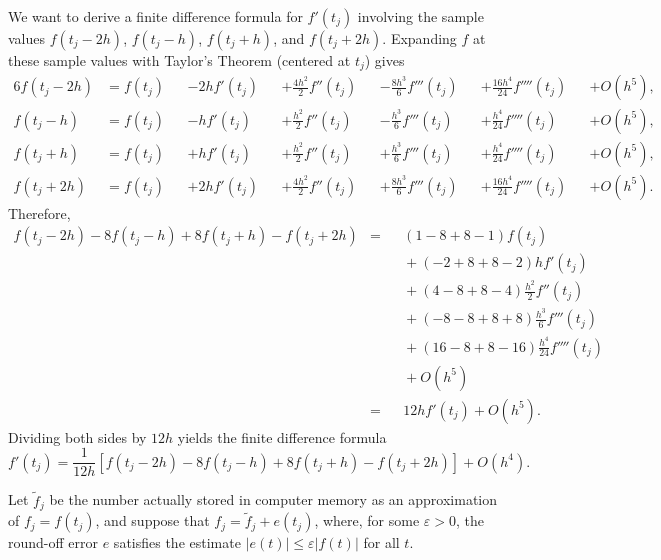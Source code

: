 \documentclass{homework}
\begin{document}
	\maketitle
	
	\question
	\begin{alphaparts}
	\questionpart We want to derive a finite difference formula for $f'(t_j)$ involving the sample values $f(t_j -2h)$, $f(t_j-h)$, $f(t_j + h)$, and $f(t_j + 2h)$. Expanding $f$ at these sample values with Taylor's Theorem (centered at $t_j$) gives
	\begin{alignat}{6}
		f(t_j - 2h) &= f(t_j)& &- 2hf'(t_j)& &+ \frac{4h^2}{2}f''(t_j)& &- \frac{8h^3}{6}f'''(t_j)& &+ \frac{16h^4}{24}f''''(t_j)& &+ O(h^5), \\
		f(t_j - h) &= f(t_j)& &- hf'(t_j)& &+ \frac{h^2}{2}f''(t_j)& &- \frac{h^3}{6}f'''(t_j)& &+ \frac{h^4}{24}f''''(t_j)& &+ O(h^5), \\
		f(t_j + h) &= f(t_j)& &+ hf'(t_j)& &+ \frac{h^2}{2}f''(t_j)& &+ \frac{h^3}{6}f'''(t_j)& &+ \frac{h^4}{24}f''''(t_j)& &+ O(h^5), \\
		f(t_j + 2h) &= f(t_j)& &+ 2hf'(t_j)& &+ \frac{4h^2}{2}f''(t_j)& &+ \frac{8h^3}{6}f'''(t_j)& &+ \frac{16h^4}{24}f''''(t_j)& &+ O(h^5).
	\end{alignat}
	Therefore,
	\begin{equation}
	\begin{alignedat}{2}
		f(t_j - 2h) - 8f(t_j-h) + 8f(t_j + h) - f(t_j + 2h) &{}={}&& (1-8+8-1)f(t_j)\\[0.5em] &&&{}+ (-2 +8 + 8-2)hf'(t_j) \\ &&&{}+ (4-8+8-4)\frac{h^2}{2}f''(t_j) \\&&&{}+ (-8-8+8+8)\frac{h^3}{6}f'''(t_j) \\&&&{}+ (16-8+8-16)\frac{h^4}{24}f''''(t_j) \\&&&{}+ O(h^5) \\[0.5em]
		&{}={}& &12hf'(t_j) + O(h^5).
	\end{alignedat}
	\end{equation}
	Dividing both sides by $12h$ yields the finite difference formula
	\begin{equation}
		f'(t_j) = \frac{1}{12h}\left[f(t_j - 2h) - 8f(t_j - h) + 8f(t_j+h) - f(t_j + 2h)\right] + O(h^4).
	\end{equation}
	
	\questionpart
	\newcommand{\fcpu}{\tilde{f}}
	Let $\fcpu_j$ be the number actually stored in computer memory as an approximation of $f_j = f(t_j)$, and suppose that $f_j = \fcpu_j + e(t_j)$, where, for some $\varepsilon > 0$, the round-off error $e$ satisfies the estimate $|e(t)| \le \varepsilon|f(t)|$ for all $t$.
	

\end{alphaparts}
\end{document}
